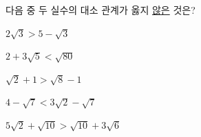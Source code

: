다음 중 두 실수의 대소 관계가 옳지 \underline{않은} 것은?
\begin{choicesv}{\rule[-3ex]{0pt}{8ex}$2\sqrt{3}>5-\sqrt{3}$}{\rule[-3ex]{0pt}{8ex}$2+3\sqrt{5}<\sqrt{80}$}{\rule[-3ex]{0pt}{8ex}$\sqrt{2}+1>\sqrt{8}-1$}{\rule[-3ex]{0pt}{8ex}$4-\sqrt{7}<3\sqrt{2}-\sqrt{7}$}{\rule[-3ex]{0pt}{8ex}$5\sqrt{2}+\sqrt{10}>\sqrt{10}+3\sqrt{6}$}\end{choicesv}
